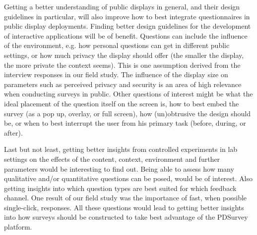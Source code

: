Getting a better understanding of public displays in general, and their design guidelines in particular, will also improve how to best integrate questionnaires in public display deployments. Finding better design guidelines for the development of interactive applications will be of benefit. Questions can include the influence of the environment, e.g. how personal questions can get in different public settings, or how much privacy the display should offer (the smaller the display, the more private the context seems). This is one assumption derived from the interview responses in our field study. The influence of the display size on parameters such as perceived privacy and security is an area of high relevance when conducting surveys in public.
Other questions of interest might be what the ideal placement of the question itself on the screen is, how to best embed the survey (as a pop up, overlay, or full screen), how (un)obtrusive the design should be, or when to best interrupt the user from his primary task (before, during, or after).





Last but not least, getting better insights from controlled experiments in lab settings on the effects of the content, context, environment and further parameters would be interesting to find out. Being able to assess how many qualitative and/or quantitative questions can be posed, would be of interest. Also getting insights into which question types are best suited for which feedback channel. One result of our field study was the importance of fast, when possible single-click, responses.
All these questions would lead to getting better insights into how surveys should be constructed to take best advantage of the PDSurvey platform.


